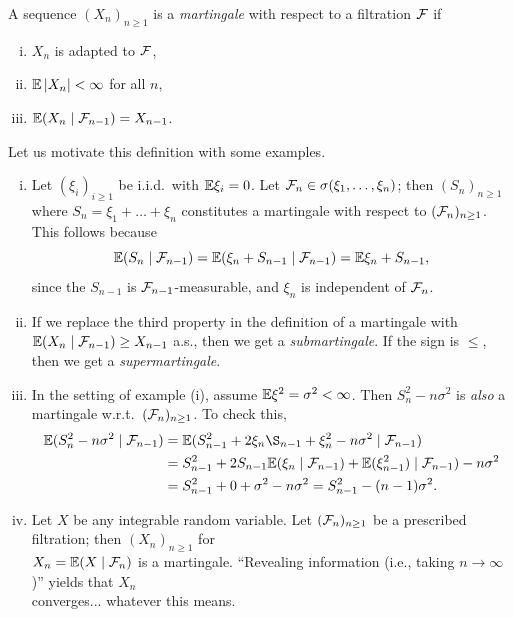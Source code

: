 \begin{definition}[Martingale] \label{defn:martingale}
    A sequence $(X_n)_{n \geq 1}$ is a \textit{martingale} with respect to a filtration $\mathcal F$ if
    \begin{enumerate}[(i)]
        \item $X_n$ is adapted to $\mathcal F$,
        \item $\mathbb E \left\lvert X_n \right\rvert < \infty$ for all $n$,
        \item $\mathbb E(X_n \mid \mathcal F_{n-1}) = X_{n-1}$.
    \end{enumerate}
\end{definition}

Let us motivate this definition with some examples.
\begin{enumerate}[(i)]
    \item Let $(\xi_i)_{i \geq 1}$ be i.i.d.\ with $\mathbb E \xi_i = 0$. Let $\mathcal F_n \in \sigma(\xi_1, \dots, \xi_n)$; then $(S_n)_{n \geq 1}$ where $S_n = \xi_1 + \dots + \xi_n$ constitutes a martingale with respect to $(\mathcal F_n)_{n \geq 1}$. This follows because 
    \[ \mathbb E(S_n \mid \mathcal F_{n-1}) = \mathbb E(\xi_n + S_{n-1} \mid \mathcal F_{n-1}) = \mathbb E \xi_n + S_{n-1}, \]
    since the $S_{n-1}$ is $\mathcal F_{n-1}$-measurable, and $\xi_n$ is independent of $\mathcal F_n$.

    \item If we replace the third property in the definition of a martingale with $\mathbb E(X_n \mid \mathcal F_{n-1}) \geq X_{n-1}$ a.s., then we get a \textit{submartingale}. If the sign is $\leq$, then we get a \textit{supermartingale}.
    
    \item In the setting of example (i), assume $\mathbb E \xi^2 = \sigma^2 < \infty$. Then $S_n^2 - n \sigma^2$ is \textit{also} a martingale w.r.t.\ $(\mathcal F_n)_{n \geq 1}$. To check this,
    \begin{align*}
        \EE(S_n^2 - n \sigma^2 \mid \SF_{n-1}) &= \EE(S_{n-1}^2 + 2 \xi_n \S_{n-1} + \xi_n^2 - n \sigma^2 \mid \SF_{n-1}) \\
        &= S_{n-1}^2 + 2 S_{n-1} \EE(\xi_n \mid \SF_{n-1}) + \EE(\xi_{n-1}^2) \mid \SF_{n-1}) - n \sigma^2 \\
        &= S_{n-1}^2 + 0 + \sigma^2 - n\sigma^2 = S_{n-1}^2 - (n - 1) \sigma^2.
    \end{align*}

    \newpage
    \item Let $X$ be any integrable random variable. Let $(\mathcal F_n)_{n \geq 1}$ be a prescribed filtration; then $(X_n)_{n \geq 1}$ for \\ $X_n = \mathbb E(X \mid \mathcal F_n)$ is a martingale. {\color{amethyst}``Revealing information (i.e., taking $n \to \infty$)'' yields that $X_n$ \\ converges... whatever this means.}
\end{enumerate}

